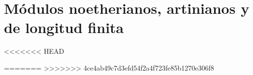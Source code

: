 \chapter{Módulos noetherianos, artinianos y de longitud finita}
<<<<<<< HEAD


=======
>>>>>>> 4ce4ab49c7d3efd54f2a4f723fe85b1270e306f8









    